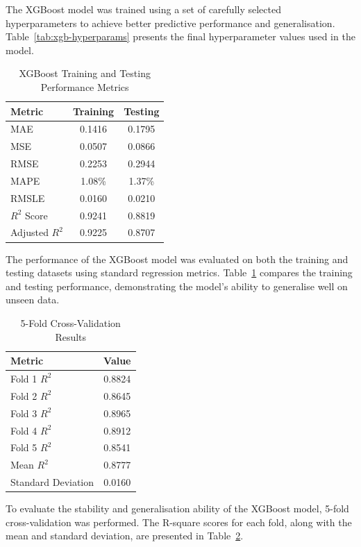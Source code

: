 \documentclass[12pt]{report}
\numberwithin{figure}{chapter}
\numberwithin{table}{chapter}
\numberwithin{equation}{chapter}
\begin{document}
The XGBoost model was trained using a set of carefully selected hyperparameters to achieve better predictive performance and generalisation. Table~\ref{tab:xgb-hyperparams} presents the final hyperparameter values used in the model.

\begin{table}[H]
\centering
\caption{XGBoost Training and Testing Performance Metrics}
\label{tab:xgb-performance}
\begin{tabular}{|l|c|c|}
\hline
\textbf{Metric} & \textbf{Training} & \textbf{Testing} \\
\hline
MAE & 0.1416 & 0.1795 \\
\hline
MSE & 0.0507 & 0.0866 \\
\hline
RMSE & 0.2253 & 0.2944 \\
\hline
MAPE & 1.08\% & 1.37\% \\
\hline
RMSLE & 0.0160 & 0.0210 \\
\hline
$R^2$ Score & 0.9241 & 0.8819 \\
\hline
Adjusted $R^2$ & 0.9225 & 0.8707 \\
\hline
\end{tabular}
\end{table}

The performance of the XGBoost model was evaluated on both the training and testing datasets using standard regression metrics. Table~\ref{tab:xgb-performance} compares the training and testing performance, demonstrating the model's ability to generalise well on unseen data.

\begin{table}[H]
\centering
\caption{5-Fold Cross-Validation Results}
\label{tab:xgb-cv-results}
\begin{tabular}{|l|c|}
\hline
\textbf{Metric} & \textbf{Value} \\
\hline
Fold 1 $R^2$ & 0.8824 \\
\hline
Fold 2 $R^2$ & 0.8645 \\
\hline
Fold 3 $R^2$ & 0.8965 \\
\hline
Fold 4 $R^2$ & 0.8912 \\
\hline
Fold 5 $R^2$ & 0.8541 \\
\hline
Mean $R^2$ & 0.8777 \\
\hline
Standard Deviation & 0.0160 \\
\hline
\end{tabular}
\end{table}

To evaluate the stability and generalisation ability of the XGBoost model, 5-fold cross-validation was performed. The R-square scores for each fold, along with the mean and standard deviation, are presented in Table~\ref{tab:xgb-cv-results}.
\end{document}
